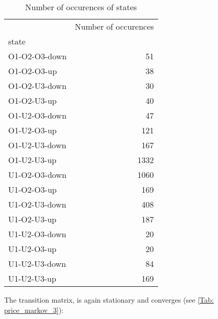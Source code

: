 \begin{table}[H]
\caption{Number of occurences of states}
\centering
\begin{tabular}{lr}
\toprule
{} &  Number of occurences \\
state         &        \\
\midrule
O1-O2-O3-down &     51 \\
O1-O2-O3-up   &     38 \\
O1-O2-U3-down &     30 \\
O1-O2-U3-up   &     40 \\
O1-U2-O3-down &     47 \\
O1-U2-O3-up   &    121 \\
O1-U2-U3-down &    167 \\
O1-U2-U3-up   &   1332 \\
U1-O2-O3-down &   1060 \\
U1-O2-O3-up   &    169 \\
U1-O2-U3-down &    408 \\
U1-O2-U3-up   &    187 \\
U1-U2-O3-down &     20 \\
U1-U2-O3-up   &     20 \\
U1-U2-U3-down &     84 \\
U1-U2-U3-up   &    169 \\
\bottomrule
\end{tabular}
\label{Tab: price_markov_2}
\end{table}


The transition matrix, is again stationary and converges (see \ref{Tab: price_markov_3}):


